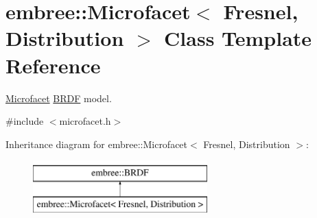 \hypertarget{classembree_1_1_microfacet}{
\section{embree::Microfacet$<$ Fresnel, Distribution $>$ Class Template Reference}
\label{classembree_1_1_microfacet}
}


\hyperlink{classembree_1_1_microfacet}{Microfacet} \hyperlink{classembree_1_1_b_r_d_f}{BRDF} model.  




{\ttfamily \#include $<$microfacet.h$>$}

Inheritance diagram for embree::Microfacet$<$ Fresnel, Distribution $>$:\begin{figure}[H]
\begin{center}
\leavevmode
\includegraphics[height=2.000000cm]{classembree_1_1_microfacet}
\end{center}
\end{figure}

